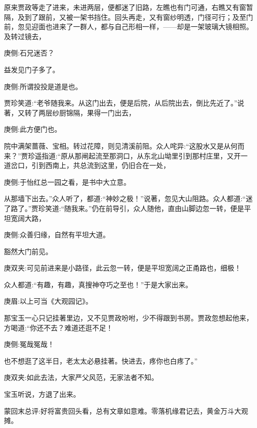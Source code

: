 \begin{parag}
    原来贾政等走了进来，未进两层，便都迷了旧路，左瞧也有门可通，右瞧又有窗暂隔，及到了跟前，又被一架书挡住。回头再走，又有窗纱明透，门径可行；及至门前，忽见迎面也进来了一群人，都与自己形相一样，——却是一架玻璃大镜相照。及转过镜去，\begin{note}庚侧:石兄迷否？\end{note}益发见门子多了。\begin{note}庚侧:所谓投投是道是也。\end{note}贾珍笑道:“老爷随我来。从这门出去，便是后院，从后院出去，倒比先近了。”说著，又转了两层纱厨锦隔，果得一门出去，\begin{note}庚侧:此方便门也。\end{note}院中满架蔷薇、宝相。转过花障，则见清溪前阻。众人咤异:“这股水又是从何而来？”贾珍遥指道:“原从那闸起流至那洞口，从东北山坳里引到那村庄里，又开一道岔口，引到西南上，共总流到这里，仍旧合在一处，\begin{note}庚侧:于怡红总一园之看，是书中大立意。\end{note}从那墙下出去。”众人听了，都道:“神妙之极！”说著，忽见大山阻路。众人都道:“迷了路了。”贾珍笑道:“随我来。”仍在前导引，众人随他，直由山脚边忽一转，便是平坦宽阔大路，\begin{note}庚侧:众善归缘，自然有平坦大道。\end{note}豁然大门前见。\begin{note}庚双夹:可见前进来是小路径，此云忽一转，便是平坦宽阔之正甬路也，细极！\end{note}众人都道:“有趣，有趣，真搜神夺巧之至也！”于是大家出来。\begin{note}庚眉:以上可当《大观园记》。\end{note}那宝玉一心只记挂著里边，又不见贾政吩咐，少不得跟到书房。贾政忽想起他来，方喝道:“你还不去？难道还逛不足！\begin{note}庚侧:冤哉冤哉！\end{note}也不想逛了这半日，老太太必悬挂著。快进去，疼你也白疼了。”\begin{note}庚双夹:如此去法，大家严父风范，无家法者不知。\end{note}宝玉听说，方退了出来。
\end{parag}


\begin{parag}
    \begin{note}蒙回末总评:好将富贵回头看，总有文章如意难。零落机缘君记去，黄金万斗大观摊。\end{note}
\end{parag}

